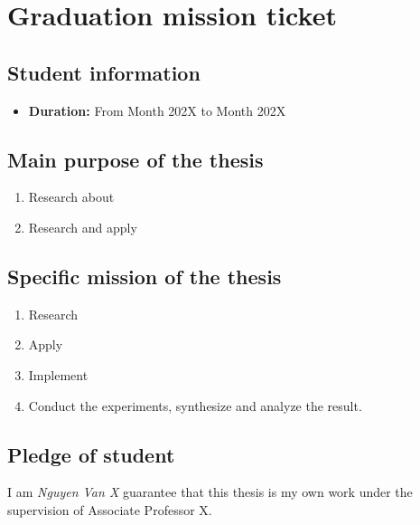 \chapter*{Graduation mission ticket}
\section*{Student information}

\begin{itemize}
\item \textbf{Duration:} From Month 202X to Month 202X
\end{itemize}
\section*{Main purpose of the thesis}
\begin{enumerate}
    \item Research about 
    \item Research and apply
\end{enumerate}

\section*{Specific mission of the thesis}
\begin{enumerate}
    \item Research 
    \item Apply 
    \item Implement 
    \item Conduct the experiments, synthesize and analyze the result.
\end{enumerate}

\pagebreak

\section*{Pledge of student}
I am \textit{Nguyen Van X} guarantee that this thesis is my own work under the supervision of Associate Professor X.

